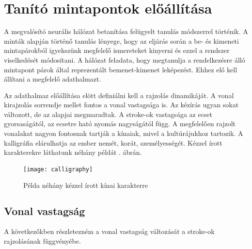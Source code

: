 \section{Tanító mintapontok előállítása}

A megvalósító neurális hálózat betanítása felügyelt tanulás módszerrel történik. A minták alapján történő tanulás lényege, hogy az eljárás során a be- és kimeneti mintapárokból igyekszünk megfelelő ismereteket kinyerni és ezzel a rendszer viselkedését módosítani. A hálózat feladata, hogy megtanulja a rendelkezésre álló mintapont párok által reprezentált bemenet-kimenet leképezést. Ehhez elő kell állítani a megfelelő adathalmazt.

Az adathalmaz előállítása elött definiálni kell a rajzolás dinamikáját. A vonal kirajzolás sorrendje mellet fontos a vonal vastagsága is. Az kézírás ugyan sokat változott, de az alapjai megmaradtak. A stroke-ok vastagsága az ecset gyorsaságától, az ecsetre ható nyomás nagyságától függ. A megfelelően rajzolt vonalakat nagyon fontosnak tartják a kínaiak, mivel a kultúrájukhoz tartozik. A kalligráfia elárulhatja az ember nemét, korát, személyességét. Kézzel írott karakterekre láthatunk néhány példát . ábrán.

\begin{figure}
\centering
\texttt{[image: calligraphy]}
\caption{Példa néhány kézzel írott kínai karakterre}
\label{fig:calligraphy}
\end{figure}

\subsection{Vonal vastagság}

A következőkben részletezném a vonal vastagság változását a stroke-ok rajzolásának függvényébe. 

